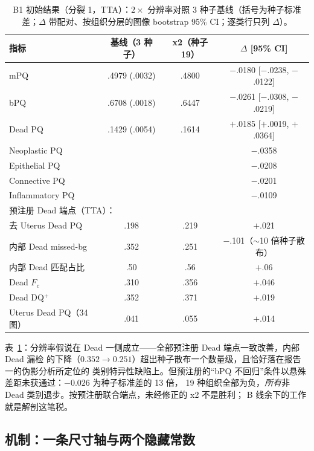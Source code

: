 \documentclass[11pt]{article}
\begin{document}
\begin{table}[t]
\centering\small
\caption{B1 初始结果（分裂 1，TTA）：$2\times$ 分辨率对照 3 种子基线（括号为种子标准
差；$\Delta$ 带配对、按组织分层的图像 bootstrap 95\% CI；逐类行只列 $\Delta$）。}
\label{tab:b1}
\begin{tabular}{lccc}
\toprule
指标 & 基线（3 种子） & x2（种子 19） & $\Delta$ [95\% CI] \\
\midrule
mPQ                & .4979 (.0032) & .4800 & $-$.0180 [$-$.0238, $-$.0122] \\
bPQ                & .6708 (.0018) & .6447 & $\mathbf{-}$.0261 [$-$.0308, $-$.0219] \\
Dead PQ            & .1429 (.0054) & .1614 & $\mathbf{+}$.0185 [$+$.0019, $+$.0364] \\
Neoplastic PQ      & & & $-$.0358 \\
Epithelial PQ      & & & $-$.0208 \\
Connective PQ      & & & $-$.0201 \\
Inflammatory PQ    & & & $-$.0109 \\
\midrule
\multicolumn{4}{l}{预注册 Dead 端点（TTA）：}\\
\quad 去 Uterus Dead PQ        & .198 & .219 & $+$.021 \\
\quad 内部 Dead missed-bg      & .352 & .251 & $-$.101（$\sim$10 倍种子散布） \\
\quad 内部 Dead 匹配占比       & .50 & .56 & $+$.06 \\
\quad Dead $F_c$               & .310 & .356 & $+$.046 \\
\quad Dead DQ$^+$              & .352 & .371 & $+$.019 \\
\quad Uterus Dead PQ（34 图）  & .041 & .055 & $+$.014 \\
\bottomrule
\end{tabular}
\end{table}

表~\ref{tab:b1}：分辨率假说在 Dead 一侧成立——全部预注册 Dead 端点一致改善，内部 Dead 漏检
的下降（$0.352\!\to\!0.251$）超出种子散布一个数量级，且恰好落在报告一的伪影分析所定位的
类别特异性缺陷上。但预注册的“bPQ 不回归”条件以悬殊差距未获通过：$-0.026$ 为种子标准差的 13 倍，
19 种组织全部为负，\emph{所有}非 Dead 类别退步。按预注册联合端点，未经修正的 x2 不是胜利；
B 线余下的工作就是解剖这笔税。

\subsection{机制：一条尺寸轴与两个隐藏常数}
\label{sec:mechanism}
\end{document}
